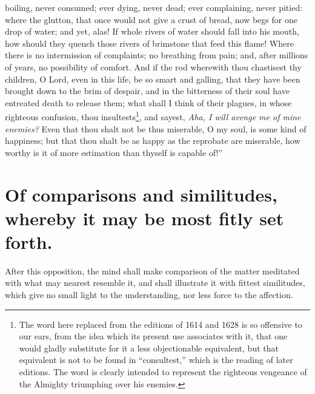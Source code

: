 boiling, never consumed; ever dying, never dead; ever complaining, never pitied: where the glutton, that once would not give a crust of bread, now begs for one drop of water; and yet, alas! If whole rivers of water should fall into his mouth, how should they quench those rivers of brimstone that feed this flame! Where there is no intermission of complaints; no breathing from pain; and, after millions of years, no possibility of comfort. And if the rod wherewith thou chastisest thy children, O Lord, even in this life, be so smart and galling, that they have been brought down to the brim of despair, and in the bitterness of their soul have entreated death to release them; what shall I think of their plagues, in whose righteous confusion, thou insultests\footnote{The word here replaced from the editions of 1614 and 1628 is so offensive to our ears, from the idea which its present use associates with it, that one would gladly substitute for it a less objectionable equivalent, but that equivalent is not to be found in ``consultest,'' which is the reading of later editions. The word is clearly intended to represent the righteous vengeance of the Almighty triumphing over his enemies.}, and sayest, \emph{Aha, I will avenge me of mine enemies?} Even that thou shalt not be thus miserable, O my soul, is some kind of happiness; but that thou shalt be as happy as the reprobate are miserable, how worthy is it of more estimation than thyself is capable of!''

\section{Of comparisons and similitudes, whereby it may be most fitly set forth.}

After this opposition, the mind shall make comparison of the matter meditated with what may nearest resemble it, and shall illustrate it with fittest similitudes, which give no small light to the understanding, nor less force to the affection. 

